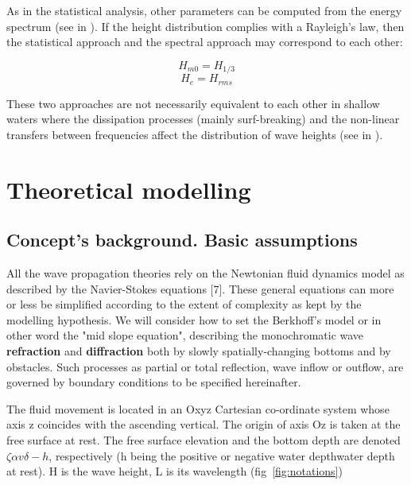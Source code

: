 As in the statistical analysis, other parameters can be computed from the
energy spectrum (see in \cite{SeaState}). If the height distribution
complies with a Rayleigh's law, then the statistical approach and the spectral
approach may correspond to each other:

$$ H_{m0} = H_{1/3} $$
$$ H_{e} = H_{rms} $$

These two approaches are not necessarily equivalent to each other in shallow
waters where the dissipation processes (mainly surf-breaking) and the
non-linear transfers between frequencies affect the distribution of wave
heights (see in \cite{Hamm1995}).


\section{Theoretical modelling}


\subsection{Concept's background. Basic assumptions}

All the wave propagation theories rely on the Newtonian fluid dynamics model as
described by the Navier-Stokes equations [7]. These general equations can more
or less be simplified according to the extent of complexity as kept by the
modelling hypothesis. We will consider how to set the Berkhoff's model
\cite{berkhoff1976} or in other word the "mid slope equation", describing the
monochromatic wave \textbf{refraction} and \textbf{diffraction} both by slowly
spatially-changing bottoms and by obstacles. Such processes as partial or total
reflection, wave inflow or outflow, are governed by boundary conditions to be
specified hereinafter.

The fluid movement is located in an Oxyz Cartesian co-ordinate system whose
axis z coincides with the ascending vertical. The origin of axis Oz is taken at
the free surface at rest. The free surface elevation and the bottom depth are
denoted $\zeta\alpha{v}\delta-h$, respectively (h being the positive or negative water
depthwater depth at rest). H is the wave height, L is its wavelength
(fig~\ref{fig:notations})

